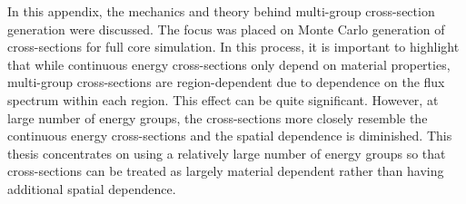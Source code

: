 \begin{appendices}
In this appendix, the mechanics and theory behind multi-group cross-section generation were discussed. The focus was placed on Monte Carlo generation of cross-sections for full core simulation. In this process, it is important to highlight that while continuous energy cross-sections only depend on material properties, multi-group cross-sections are region-dependent due to dependence on the flux spectrum within each region. This effect can be quite significant. However, at large number of energy groups, the cross-sections more closely resemble the continuous energy cross-sections and the spatial dependence is diminished. This thesis concentrates on using a relatively large number of energy groups so that cross-sections can be treated as largely material dependent rather than having additional spatial dependence.



\end{appendices}
